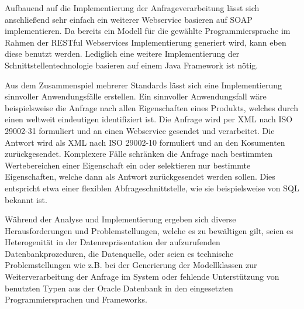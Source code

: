 Aufbauend auf die Implementierung der Anfrageverarbeitung lässt sich anschließend sehr einfach ein weiterer \gls{Webservice} basieren auf \gls{SOAP} implementieren. Da bereits ein Modell für die gewählte Programmiersprache im Rahmen der \gls{REST}ful \glspl{Webservice} Implementierung generiert wird, kann eben diese benutzt werden. Lediglich eine weitere Implementierung der Schnittstellentechnologie basieren auf einem Java Framework ist nötig.  

Aus dem Zusammenspiel mehrerer Standards lässt sich eine Implementierung sinnvoller Anwendungsfälle erstellen. 
Ein sinnvoller Anwendungsfall wäre beispielsweise die Anfrage nach allen Eigenschaften eines Produkts, welches durch einen weltweit eindeutigen  identifiziert ist. Die Anfrage wird per XML nach ISO 29002-31 formuliert und an einen \gls{Webservice} gesendet und verarbeitet. Die Antwort wird als XML nach ISO 29002-10 formuliert und an den Kosumenten zurückgesendet. Komplexere Fälle schränken die Anfrage nach bestimmten Wertebereichen einer Eigenschaft ein oder selektieren nur bestimmte Eigenschaften, welche dann als Antwort zurückgesendet werden sollen. Dies entspricht etwa einer flexiblen \gls{Abfrageschnittstelle}, wie sie beispielsweise von SQL bekannt ist.  

Während der Analyse und Implementierung ergeben sich diverse Herausforderungen und Problemstellungen, welche es zu bewältigen gilt, seien es Heterogenität in der Datenrepräsentation der aufzurufenden Datenbankprozeduren, die Datenquelle, oder seien es technische Problemstellungen wie z.B. bei der Generierung der Modellklassen zur Weiterverarbeitung der Anfrage im System oder fehlende Unterstützung von benutzten Typen aus der Oracle Datenbank in den eingesetzten Programmiersprachen und Frameworks.  




